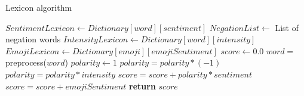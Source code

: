 \begin{algorithm}[H]
  \caption{Lexicon algorithm}\label{lexiconAlg}
    \begin{algorithmic}[1]
            \State $SentimentLexicon \gets Dictionary[word][sentiment]$
            \State $NegationList \gets$ List of negation words
            \State $IntensityLexicon \gets Dictionary[word][intensity]$
            \State $EmojiLexicon \gets Dictionary[emoji][emojiSentiment]$ 
            \State $score \gets 0.0$
                \State $word =$ preprocess($word$)
                    \State $polarity \gets 1$
                            \State $polarity = polarity * (-1)$
                        \Else
                                \State $polarity = polarity * intensity$
                            \EndIf
                        \EndIf
                    \EndFor
                    \State $score = score + polarity * sentiment$
                \Else
                        \State $score = score + emojiSentiment$
                    \EndIf
                \EndIf 
            \EndFor
            \State \textbf{return} $score$
        \EndFunction
    \end{algorithmic}
\end{algorithm}





